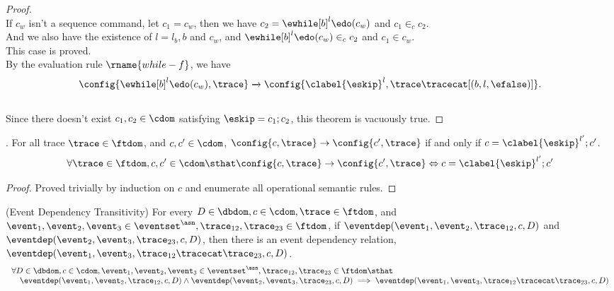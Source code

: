 \begin{proof}
		\\
		If $c_w$ isn't a sequence command, let $c_1 = c_w$, then we have $c_2 = \ewhile [b]^{l} \edo (c_w)$ 
		and $c_1 \in_c c_2$.
		\\
		And we also have the existence of $l = l_b, b$ and $c_w$, and $\ewhile [b]^{l} \edo (c_w) \in_c c_2$ and  $c_1 \in c_w$.
		\\
		This case is proved.
		\\
		By the evaluation rule $\rname{while-f}$, we have
		$$
		{
			\config{{\ewhile [b]^{l} \edo (c_w), \trace}}
			\xrightarrow{} 
			\config{{
			\clabel{\eskip}^l ,
			\trace \tracecat [(b, l, \efalse)]}}.
		}$$
		\\
		Since there doesn't exist $c_1, c_2 \in \cdom$ satisfying $\eskip = c_1; c_2$, this theorem is vacuously true.
	\end{proof}
%
%
\begin{lem}.
	\label{lem:inv_skip}
	For all trace $\trace\in \ftdom$, and $c, c' \in \cdom$,  
	$\config{c, \trace} \rightarrow \config{c', \trace}$ if and only if $c = \clabel{\eskip}^{l'};c'$. 
	\[
		\forall \trace\in \ftdom, c, c' \in \cdom \sthat 
		\config{c, \trace} \rightarrow \config{c', \trace}
		\Leftrightarrow 
		c = \clabel{\eskip}^{l'};c'
	\]
	\end{lem}
\begin{proof}
	Proved trivially by induction on $c$ and enumerate all operational semantic rules.
\end{proof}
%
\begin{lem}
	\label{lem:valdep_trans}
(Event Dependency Transitivity)
For every $D \in \dbdom , c \in \cdom, \trace \in \ftdom$, and $\event_1, \event_2, \event_3 \in \eventset^{\asn}, \trace_{12}, \trace_{23} \in \ftdom$,
if $\eventdep(\event_1, \event_2, \trace_{12}, c, D)$
and $\eventdep(\event_2, \event_3, \trace_{23}, c, D) $,
then there is an event dependency relation,
$\eventdep(\event_1, \event_3, \trace_{12}\tracecat\trace_{23}, c, D)$.
  \[
	  \begin{array}{l}
  \forall D \in \dbdom , c \in \cdom, \event_1, \event_2, \event_3 \in \eventset^{\asn}, \trace_{12}, \trace_{23} \in \ftdom \sthat  
  \\ \quad
  \eventdep(\event_1, \event_2, \trace_{12}, c, D) 
  \land
  \eventdep(\event_2, \event_3, \trace_{23}, c, D) 
  \implies
  \eventdep(\event_1, \event_3, \trace_{12}\tracecat\trace_{23}, c, D)
	  \end{array}
  \]
\end{lem}
%
%


